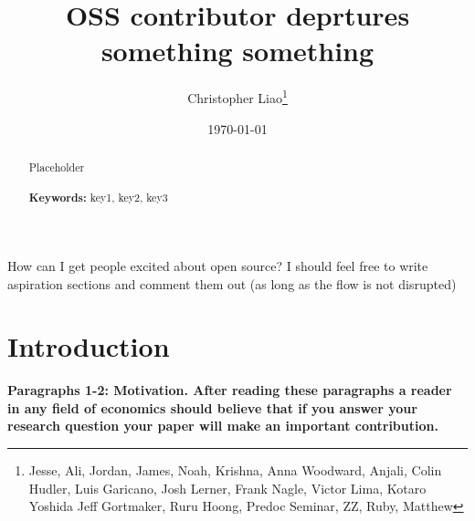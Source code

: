 \documentclass[12pt,notitlepage]{article}
\begin{document}
\begin{titlepage}
\title{OSS contributor deprtures something something}
\author{Christopher Liao\thanks{Jesse, Ali, Jordan, James, Noah, Krishna, Anna Woodward, Anjali, Colin Hudler, 
Luis Garicano, Josh Lerner, Frank Nagle, Victor Lima, Kotaro Yoshida 
Jeff Gortmaker, Ruru Hoong, Predoc Seminar, ZZ, Ruby, Matthew}}

\date{\today}
\maketitle
\begin{abstract}
\noindent Placeholder\\
\vspace{0in}\\
\noindent\textbf{Keywords:} key1, key2, key3\\

\bigskip
\end{abstract}
\setcounter{page}{0}
\thispagestyle{empty}
\end{titlepage}
\pagebreak \newpage

How can I get people excited about open source?
I should feel free to write aspiration sections and comment them out (as long as the flow is not disrupted) 
\section{Introduction} \label{sec:intro}


\textbf{Paragraphs 1-2: Motivation. After reading these paragraphs a reader in any field of economics should believe that if you answer your research question your paper will make an important contribution.}
\end{document}
